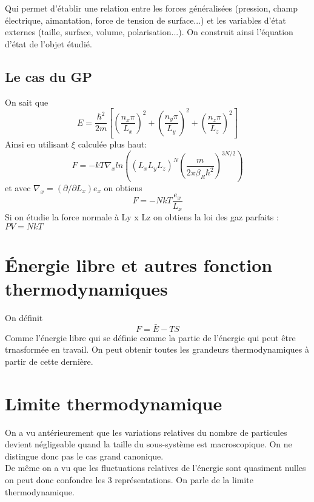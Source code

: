 Qui permet d'établir une relation entre les forces généralisées (pression, champ électrique, aimantation, force de tension de surface...) et les variables d'état externes (taille, surface, volume, polarisation...). On construit ainsi l'équation d'état de l'objet étudié.

\subsection{Le cas du GP}

On sait que 
$$ E= \frac{\hbar^2}{2m}\left[\left(\frac{n_x\pi}{L_x}\right)^2+\left(\frac{n_y\pi}{L_y}\right)^2+\left(\frac{n_z\pi}{L_z}\right)^2\right]$$
Ainsi en utilisant $\xi$ calculée plus haut:
$$ F= -kT\nabla_x ln\left(\left( L_x L_y L_z\right)^N \left(\frac{m}{2 \pi \beta_R \hbar^2}\right)^{3N/2}\right) $$
et avec $\nabla_x = (\partial / \partial L_x)e_x $
on obtiens 
$$F= -NkT\frac{e_x}{L_x}$$
Si on étudie la force normale à Ly x Lz on obtiens la loi des gaz parfaits : $PV=NkT$


\section{Énergie libre et autres fonction thermodynamiques}


On définit 
$$F= \bar{E}-TS$$ 
Comme l'énergie libre qui se définie comme la partie de l'énergie qui peut être trnasformée en travail. On peut obtenir toutes les grandeurs thermodynamiques à partir de cette dernière.


\section{Limite thermodynamique}


On a vu antérieurement que les variations relatives du nombre de particules devient négligeable quand la taille du sous-système est macroscopique. On ne distingue donc pas le cas grand canonique. \\
De même on a vu que les fluctuations relatives de l'énergie sont quasiment nulles on peut donc confondre les 3 représentations.
On parle de la limite thermodynamique.